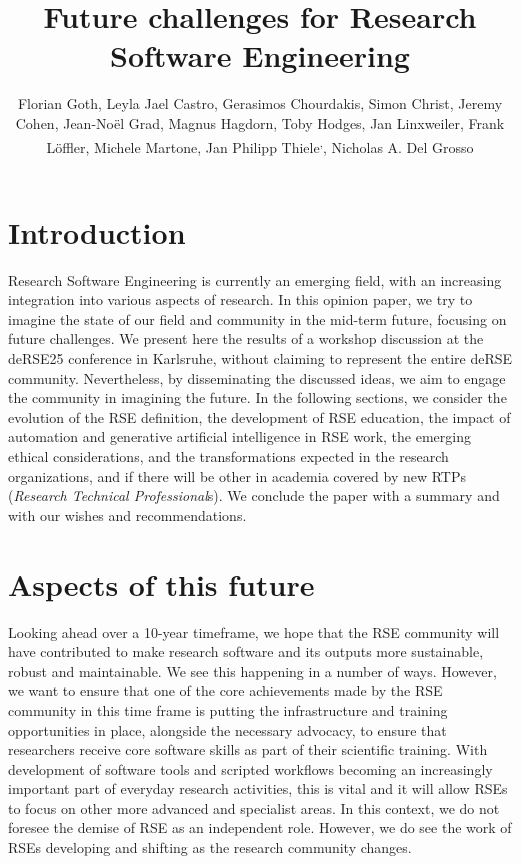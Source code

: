 \documentclass{eceasst}
\title{Future challenges for Research Software Engineering} %
\author{
Florian Goth\authorRef{1},
Leyla Jael Castro\authorRef{2},
Gerasimos Chourdakis\authorRef{3},
Simon Christ\authorRef{4},
Jeremy Cohen\authorRef{5},
Jean-Noël Grad\authorRef{6},
Magnus Hagdorn\authorRef{7},
Toby Hodges\authorRef{8},
Jan Linxweiler\authorRef{9},
Frank Löffler\authorRef{10},
Michele Martone\authorRef{11},
Jan Philipp Thiele\authorRef{9}\textsuperscript{,}\authorRef{12},
Nicholas A. Del Grosso\authorRef{13}
} %
\institute{%
\autlabel{1} Würzburg-Dresden Cluster of Excellence ct.qmat, University of Würzburg, 97074, Würzburg, Germany\par
\autlabel{2} ZB MED Information Centre for Life Sciences, Cologne, Germany\par
\autlabel{3} Institute for Parallel and Distributed Systems, University of Stuttgart, Stuttgart, Germany\par
\autlabel{4} Leibniz University Hannover, Department of Cell Biology and Biophysics, Computational Biology, Germany\par
\autlabel{5} Imperial College London, London, UK\par
\autlabel{6} Institute for Computational Physics, University of Stuttgart, Germany\par
\autlabel{7} Geschäftsbereich IT, Charité Universitätsmedizin Berlin, Germany\par
\autlabel{8} The Carpentries, USA\par
\autlabel{9} Technische Universität Braunschweig, Germany\par
\autlabel{10} Michael Stifel Center Jena {\&} Friedrich Schiller University Jena, Germany\par
\autlabel{11} Leibniz Supercomputing Centre, Garching, Germany\par
\autlabel{12} Weierstrass Institute, Berlin, Germany;
              Leibniz University Hannover, Institute of Applied Mathematics, Scientific Computing, Hannover, Germany\par
\autlabel{13} Institute for Experimental Epileptology and Cognition Research, Uniklinikum Bonn, Germany
}
\begin{document}
\maketitle

\section{Introduction}

Research Software Engineering is currently an emerging field,
with an increasing integration into various aspects of research.
In this opinion paper, we try to imagine the state of our field
and community in the mid-term future, focusing on future challenges.
We present here the results of a workshop discussion at the
deRSE25 conference in Karlsruhe\cite{Goth2025EndRSEng}, without
claiming to represent the entire deRSE community.
Nevertheless, by disseminating the discussed ideas,
we aim to engage the community in imagining the future.
In the following sections, we consider the evolution of the RSE definition,
the development of RSE education,
the impact of automation and generative artificial intelligence in RSE work,
the emerging ethical considerations,
and the transformations expected in the research organizations,
and if there will be other in academia covered by new RTPs (\emph{Research Technical Professional}s).
We conclude the paper with a summary and with our wishes and recommendations.

\section{Aspects of this future}
Looking ahead over a 10-year timeframe, we hope that the RSE community will have
contributed to make research software and its outputs
more sustainable, robust and maintainable. We see this happening in a number of ways. However,
we want to ensure that one of the core achievements made by the RSE community in this time
frame is putting the infrastructure and training opportunities in place, alongside the necessary
advocacy, to ensure that researchers receive core software skills as part of their scientific training.
With development of software tools and scripted workflows becoming an increasingly important part of everyday
research activities, this is vital and it will allow RSEs to focus on other more advanced and specialist
areas. In this context, we do not foresee the demise of RSE as an independent role. However, we
do see the work of RSEs developing and shifting as the research community changes.
\end{document}

